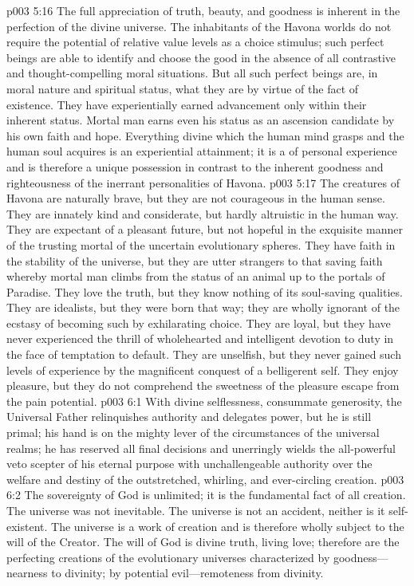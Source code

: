 \pc \vs p003 5:16 The full appreciation of truth, beauty, and goodness is inherent in the perfection of the divine universe. The inhabitants of the Havona worlds do not require the potential of relative value levels as a choice stimulus; such perfect beings are able to identify and choose the good in the absence of all contrastive and thought\hyp{}compelling moral situations. But all such perfect beings are, in moral nature and spiritual status, what they are by virtue of the fact of existence. They have experientially earned advancement only within their inherent status. Mortal man earns even his status as an ascension candidate by his own faith and hope. Everything divine which the human mind grasps and the human soul acquires is an experiential attainment; it is a  of personal experience and is therefore a unique possession in contrast to the inherent goodness and righteousness of the inerrant personalities of Havona.
\pc \vs p003 5:17 The creatures of Havona are naturally brave, but they are not courageous in the human sense. They are innately kind and considerate, but hardly altruistic in the human way. They are expectant of a pleasant future, but not hopeful in the exquisite manner of the trusting mortal of the uncertain evolutionary spheres. They have faith in the stability of the universe, but they are utter strangers to that saving faith whereby mortal man climbs from the status of an animal up to the portals of Paradise. They love the truth, but they know nothing of its soul\hyp{}saving qualities. They are idealists, but they were born that way; they are wholly ignorant of the ecstasy of becoming such by exhilarating choice. They are loyal, but they have never experienced the thrill of wholehearted and intelligent devotion to duty in the face of temptation to default. They are unselfish, but they never gained such levels of experience by the magnificent conquest of a belligerent self. They enjoy pleasure, but they do not comprehend the sweetness of the pleasure escape from the pain potential.
\vs p003 6:1 With divine selflessness, consummate generosity, the Universal Father relinquishes authority and delegates power, but he is still primal; his hand is on the mighty lever of the circumstances of the universal realms; he has reserved all final decisions and unerringly wields the all\hyp{}powerful veto scepter of his eternal purpose with unchallengeable authority over the welfare and destiny of the outstretched, whirling, and ever\hyp{}circling creation.
\vs p003 6:2 The sovereignty of God is unlimited; it is the fundamental fact of all creation. The universe was not inevitable. The universe is not an accident, neither is it self\hyp{}existent. The universe is a work of creation and is therefore wholly subject to the will of the Creator. The will of God is divine truth, living love; therefore are the perfecting creations of the evolutionary universes characterized by goodness---nearness to divinity; by potential evil---remoteness from divinity.\plusone
